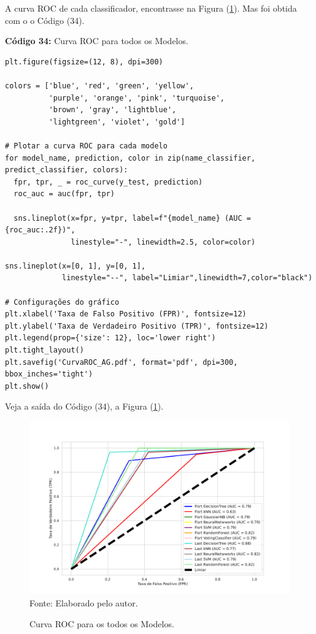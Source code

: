 \documentclass[a4paper,12pt]{article} %
\begin{document}
 A curva ROC de cada classificador, encontrasse na Figura (\ref{fig:9}). Mas foi obtida com o o Código (34).
\begin{center}
\textbf{Código 34:} Curva ROC para todos os Modelos.
\begin{verbatim}
plt.figure(figsize=(12, 8), dpi=300)

colors = ['blue', 'red', 'green', 'yellow',
          'purple', 'orange', 'pink', 'turquoise',
          'brown', 'gray', 'lightblue',
          'lightgreen', 'violet', 'gold']

# Plotar a curva ROC para cada modelo
for model_name, prediction, color in zip(name_classifier, predict_classifier, colors):
  fpr, tpr, _ = roc_curve(y_test, prediction)
  roc_auc = auc(fpr, tpr)

  sns.lineplot(x=fpr, y=tpr, label=f"{model_name} (AUC = {roc_auc:.2f})",
               linestyle="-", linewidth=2.5, color=color)

sns.lineplot(x=[0, 1], y=[0, 1],
             linestyle="--", label="Limiar",linewidth=7,color="black")

# Configurações do gráfico
plt.xlabel('Taxa de Falso Positivo (FPR)', fontsize=12)
plt.ylabel('Taxa de Verdadeiro Positivo (TPR)', fontsize=12)
plt.legend(prop={'size': 12}, loc='lower right')
plt.tight_layout()
plt.savefig('CurvaROC_AG.pdf', format='pdf', dpi=300, bbox_inches='tight')
plt.show()
\end{verbatim}
\end{center}

Veja a saída do Código (34), a Figura (\ref{fig:9}).
 \begin{figure}[H]
     \centering
     \caption{Curva ROC para os todos os Modelos.}
     \includegraphics[scale=0.55]{Figures/CurvaROC_AG.pdf}
     \label{fig:9}
     Fonte: Elaborado pelo autor.
 \end{figure}
\end{document}

